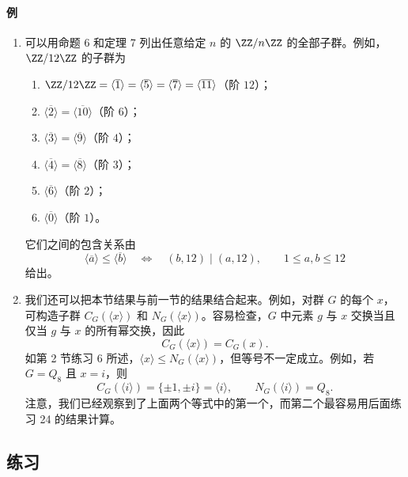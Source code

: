 \paragraph{例}
\begin{enumerate}[label=(\arabic*)]
  \item 可以用命题 6 和定理 7 列出任意给定 $n$ 的 $\ZZ/n\ZZ$ 的全部子群。例如，$\ZZ/12\ZZ$ 的子群为
  \begin{enumerate}[label=(\alph*)]
    \item $\ZZ/12\ZZ=\langle\overline{1}\rangle=\langle\overline{5}\rangle=\langle\overline{7}\rangle=\langle\overline{11}\rangle$（阶 $12$）；
    \item $\langle\overline{2}\rangle=\langle\overline{10}\rangle$（阶 $6$）；
    \item $\langle\overline{3}\rangle=\langle\overline{9}\rangle$（阶 $4$）；
    \item $\langle\overline{4}\rangle=\langle\overline{8}\rangle$（阶 $3$）；
    \item $\langle\overline{6}\rangle$（阶 $2$）；
    \item $\langle\overline{0}\rangle$（阶 $1$）。
  \end{enumerate}
  它们之间的包含关系由
  \[
    \langle\overline{a}\rangle\leq \langle\overline{b}\rangle
    \quad\Longleftrightarrow\quad
    (b,12)\mid (a,12),
    \qquad 1\leq a,b\leq 12
  \]
  给出。
  \item 我们还可以把本节结果与前一节的结果结合起来。例如，对群 $G$ 的每个 $x$，可构造子群 $C_G(\langle x\rangle)$ 和 $N_G(\langle x\rangle)$。容易检查，$G$ 中元素 $g$ 与 $x$ 交换当且仅当 $g$ 与 $x$ 的所有幂交换，因此
  \[
    C_G(\langle x\rangle)=C_G(x).
  \]
  如第 2 节练习 6 所述，$\langle x\rangle\leq N_G(\langle x\rangle)$，但等号不一定成立。例如，若 $G=Q_8$ 且 $x=i$，则
  \[
    C_G(\langle i\rangle)=\{\pm1,\pm i\}=\langle i\rangle,
    \qquad
    N_G(\langle i\rangle)=Q_8.
  \]
  注意，我们已经观察到了上面两个等式中的第一个，而第二个最容易用后面练习 24 的结果计算。
\end{enumerate}

\subsection*{练习}

